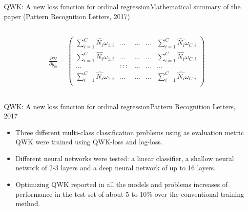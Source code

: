 \documentclass{beamer}
\begin{document}
\begin{frame}{QWK: A new loss function for ordinal regression}{Mathematical summary of the paper (Pattern Recognition Letters, 2017)}
\begin{columns}
\begin{column}{0.7\textwidth}
		\begin{equation*}
		\begin{aligned}
		\frac{\partial \mathcal{D}}{\partial y_m} =
		\begin{pmatrix} 
		\sum_{i=1}^C \hat{N_i} \omega_{1,i} & ...  & ...     & ... & \sum_{i=1}^C \hat{N_i} \omega_{C,i}\\
		\sum_{i=1}^C \hat{N_i} \omega_{1,i} & ...  & ...     & ... & \sum_{i=1}^C \hat{N_i} \omega_{C,i}\\
		... & ::: & ... & ... & ...\\
		\sum_{i=1}^C \hat{N_i} \omega_{1,i} & ...  & ...     & ... & \sum_{i=1}^C \hat{N_i} \omega_{C,i}\\ 
		\end{pmatrix}
		\end{aligned}
		\end{equation*}	
	\end{column}
\end{columns}	
\end{frame}


\begin{frame}{QWK: A new loss function for ordinal regression}{Pattern Recognition Letters, 2017}	
\begin{itemize}
\item  Three different multi-class classification problems using as evaluation metric QWK were trained using QWK-loss and log-loss.
\item Different neural networks were tested: a linear classifier, a shallow neural network of 2-3 layers and a deep neural network of up to 16 layers.
\item Optimizing QWK reported in all the models and problems increases of performance in the test set of about 5 to 10\% over the conventional training method.
\end{itemize}	
\end{frame}
\end{document}
